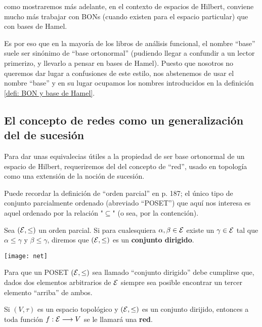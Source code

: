 \noindent
como mostraremos más adelante, en el contexto de
espacios de Hilbert, conviene mucho más trabajar con BONs
(cuando existen para el espacio particular)
que con bases de Hamel. 


Es por eso que en la mayoría
de los libros de análisis funcional, el nombre ``base''
suele ser sinónimo de 
``base ortonormal''
(pudiendo llegar a confundir
a un lector primerizo, y llevarlo a pensar en
bases de Hamel). Puesto que
nosotros no queremos dar lugar a confusiones de este estilo,
nos abstenemos de usar el nombre ``base'' y en su lugar ocupamos
los nombres introducidos en la definición \ref{defi: BON y base de Hamel}.

\subsection{El concepto de redes como un generalización del de sucesión}

Para dar unas equivalecias útiles a la propiedad de
ser base ortonormal de un espacio de Hilbert, requeriremos del
del concepto de ``red'', usado en topología como una extensión
de la noción de sucesión.


Puede recordar la definición de ``orden parcial'' en 
\cite{munkres} p. 187; el único tipo de conjunto parcialmente
ordenado (abreviado ``POSET'') que aquí nos interesa es 
aquel ordenado por la relación "$\subseteq$" (o sea, por la contención).
\begin{defi}
\label{def: conjunto dirijido}
Sea $(\mathcal{E}, \leq )$ un orden parcial. Si para cualesquiera
$\alpha, \beta \in \mathcal{E}$ existe un $\gamma \in \mathcal{E}$ tal que
$\alpha \leq \gamma$ y $\beta \leq \gamma$, diremos que 
$(\mathcal{E}, \leq)$ es un \textbf{conjunto dirigido}. 
\end{defi}

\begin{marginfigure}
\texttt{[image: net]} 
		\caption{Para que un POSET $(\mathcal{E}, \leq)$ sea llamado ``conjunto
		dirigido'' debe cumplirse que, dados dos elementos 
		arbitrarios de $\mathcal{E}$ siempre sea posible encontrar un tercer
		elemento ``arriba'' de ambos.}
\end{marginfigure}


\begin{defi}
Si $(V, \tau)$ es un espacio topológico y $(\mathcal{E}, \leq)$ es un conjunto
dirijido, entonces a toda función $f: \mathcal{E} \longrightarrow V$
se le llamará una \textbf{red}.
\end{defi}

